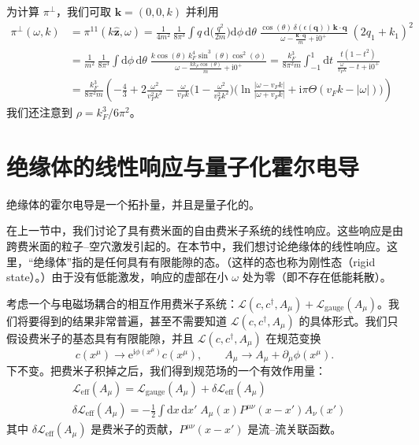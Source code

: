 为计算 $\pi^{\perp}$，我们可取 $\pmb{k} = (0, 0, k)$ 并利用
\begin{align*}
\pi^{\perp}(\omega, k) &= \pi^{11}(k\hat{\pmb{z}}, \omega)
= \frac{1}{4m^{2}}\, \frac{1}{8\pi^{3}} \int q\, \mathrm{d}\Big(\frac{q^{2}}{2m}\Big) \mathrm{d}\phi\, \mathrm{d}\theta\;
\frac{\cos(\theta)\, \delta(\epsilon(\pmb{q}))\, \pmb{k}\cdot\pmb{q}}{\omega - \frac{\pmb{k}\cdot\pmb{q}}{m} + \mathrm{i}0^{+}}\; (2q_{1} + k_{1})^{2}\\
&= \frac{1}{m^{2}}\, \frac{1}{8\pi^{3}} \int \mathrm{d}\phi\, \mathrm{d}\theta\;
\frac{k \cos(\theta)\, k_{F}^{4} \sin^{3}(\theta) \cos^{2}(\phi)}{\omega - \frac{k k_{F}\cos(\theta)}{m} + \mathrm{i}0^{+}}
= \frac{k_{F}^{3}}{8\pi^{2} m} \int_{-1}^{1} \mathrm{d}t\; \frac{t(1-t^{2})}{\frac{\omega}{v_{F} k} - t + \mathrm{i}0^{+}}\\
&= \frac{k_{F}^{3}}{8\pi^{2} m} \left( -\frac{4}{3} + 2\frac{\omega^{2}}{v_{F}^{2} k^{2}}
- \frac{\omega}{v_{F} k} \Big( 1 - \frac{\omega^{2}}{v_{F}^{2} k^{2}} \Big)
\Big( \ln \frac{|\omega - v_{F} k|}{|\omega + v_{F} k|} + \mathrm{i}\pi \Theta(v_{F} k - |\omega|) \Big) \right)
\end{align*}
我们还注意到 $\rho = k_{F}^{3}/6\pi^{2}$。

\section{绝缘体的线性响应与量子化霍尔电导}

\begin{keypoints}
\item 绝缘体的霍尔电导是一个拓扑量，并且是量子化的。
\end{keypoints}

在上一节中，我们讨论了具有费米面的自由费米子系统的线性响应。这些响应是由跨费米面的粒子--空穴激发引起的。在本节中，我们想讨论绝缘体的线性响应。这里，``绝缘体''指的是任何具有有限能隙的态。（这样的态也称为刚性态（rigid state）。）由于没有低能激发，响应的虚部在小 $\omega$ 处为零（即不存在低能耗散）。

考虑一个与电磁场耦合的相互作用费米子系统：$\mathcal{L}(c, c^{\dagger}, A_{\mu}) + \mathcal{L}_{\mathrm{gauge}}(A_{\mu})$。我们将要得到的结果非常普遍，甚至不需要知道 $\mathcal{L}(c, c^{\dagger}, A_{\mu})$ 的具体形式。我们只假设费米子的基态具有有限能隙，并且 $\mathcal{L}(c, c^{\dagger}, A_{\mu})$ 在规范变换
\begin{equation*}
c(x^{\mu}) \to \mathrm{e}^{\mathrm{i}\phi(x^{\mu})} c(x^{\mu}), \qquad A_{\mu} \to A_{\mu} + \partial_{\mu} \phi(x^{\mu}).
\end{equation*}
下不变。把费米子积掉之后，我们得到规范场的一个有效作用量：
\begin{align*}
&\mathcal{L}_{\mathrm{eff}}(A_{\mu}) = \mathcal{L}_{\mathrm{gauge}}(A_{\mu}) + \delta\mathcal{L}_{\mathrm{eff}}(A_{\mu})\\
&\delta\mathcal{L}_{\mathrm{eff}}(A_{\mu}) = -\frac{1}{2} \int \mathrm{d}x\, \mathrm{d}x'\; A_{\mu}(x) P^{\mu\nu}(x - x') A_{\nu}(x')
\end{align*}
其中 $\delta\mathcal{L}_{\mathrm{eff}}(A_{\mu})$ 是费米子的贡献，$P^{\mu\nu}(x-x')$ 是流--流关联函数。

